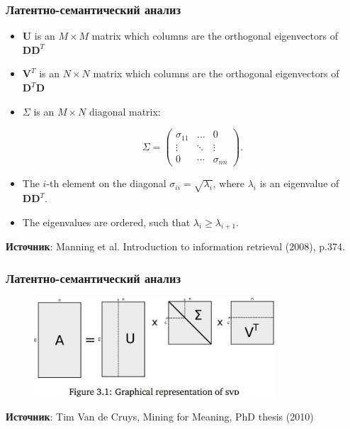 \begin{frame}
\frametitle{Латентно-семантический анализ}

\begin{itemize}

\item $\mathbf{U}$ is an $M \times M$ matrix which columns are the orthogonal eigenvectors of $\mathbf{D D}^T$
\item  $\mathbf{V}^T$ is an $N \times N$ matrix which columns are the orthogonal eigenvectors of $\mathbf{D}^T \mathbf{D}$

\item $\Sigma$ is an $M \times N$ diagonal matrix:

$$
\Sigma = \begin{pmatrix}
  \sigma_{11} & \ldots & 0 \\
  \vdots  & \ddots & \vdots  \\
  0 & \cdots & \sigma_{nn}
 \end{pmatrix}.
$$

\item The $i$-th element on the diagonal $\sigma_{ii} = \sqrt{\lambda_i}$, where $\lambda_i$ is an eigenvalue of $\mathbf{D D}^T$. 

\item The eigenvalues are ordered, such that $\lambda_i \geq \lambda_{i+1}$.  

\end{itemize}

\tiny{\textbf{Источник}: Manning et al. Introduction to information retrieval (2008), p.374.}

\end{frame}




\begin{frame}
\frametitle{Латентно-семантический анализ}

\begin{figure}
\includegraphics[width=0.8\textwidth]{./figures/lsa}
\end{figure}

\tiny{\textbf{Источник}: Tim Van de Cruys, Mining for Meaning, PhD thesis (2010)}

\end{frame}




